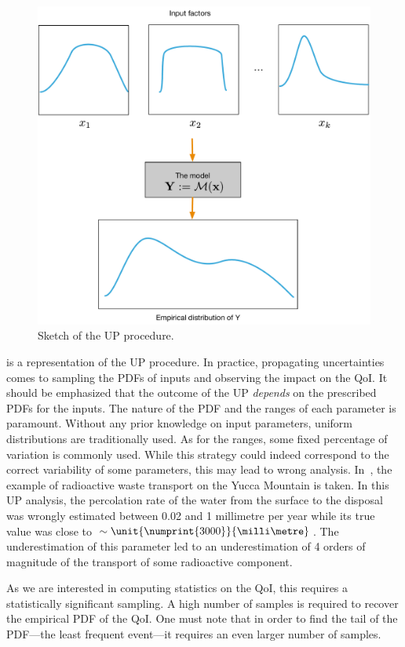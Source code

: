 \begin{figure}[!ht]
\centering
\includegraphics[width=0.7\linewidth,keepaspectratio]{fig/literature/propagation.pdf}
\caption{Sketch of the UP procedure.}
\label{fig:UP}
\end{figure}

 is a representation of the UP procedure. In practice, propagating uncertainties comes to sampling the PDFs of inputs and observing the impact on the QoI. It should be emphasized that the outcome of the UP \emph{depends} on the prescribed PDFs for the inputs. The nature of the PDF and the ranges of each parameter is paramount. Without any prior knowledge on input parameters, uniform distributions are traditionally used. As for the ranges, some fixed percentage of variation is commonly used. While this strategy could indeed correspond to the correct variability of some parameters, this may lead to wrong analysis. In~\citep{pilkey}, the example of radioactive waste transport on the Yucca Mountain is taken. In this UP analysis, the percolation rate of the water from the surface to the disposal was wrongly estimated between 0.02 and 1 millimetre per year while its true value was close to $\sim \unit{\numprint{3000}}{\milli\metre}$. The underestimation of this parameter led to an underestimation of 4 orders of magnitude of the transport of some radioactive component.

As we are interested in computing statistics on the QoI, this requires a statistically significant sampling. A high number of samples is required to recover the empirical PDF of the QoI. One must note that in order to find the tail of the PDF---the least frequent event---it requires an even larger number of samples.

